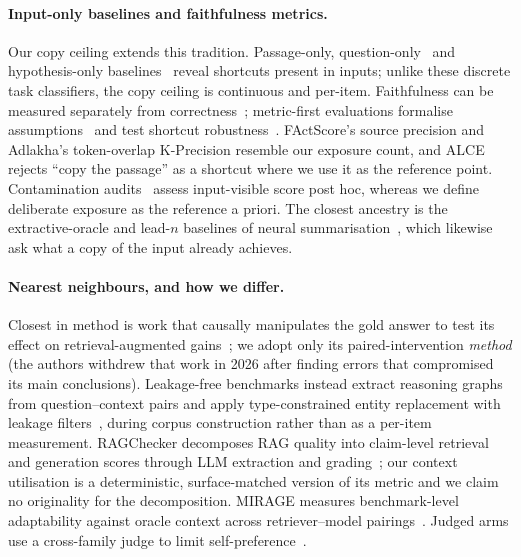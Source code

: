 \documentclass[10pt,twocolumn]{article}
\begin{document}
\paragraph{Input-only baselines and faithfulness metrics.}
Our copy ceiling extends this tradition. Passage-only, question-only~\cite{kaushik2018reading} and hypothesis-only baselines~\cite{gururangan2018artifacts,poliak2018hypothesis} reveal shortcuts present in inputs; unlike these discrete task classifiers, the copy ceiling is continuous and per-item. Faithfulness can be measured separately from correctness~\cite{es2023ragas,adlakha2024evaluating,zhou2023contextfaithful}; metric-first evaluations formalise assumptions~\cite{min2023factscore} and test shortcut robustness~\cite{gao2023alce}. FActScore's source precision and Adlakha's token-overlap K-Precision resemble our exposure count, and ALCE rejects ``copy the passage'' as a shortcut where we use it as the reference point. Contamination audits~\cite{sainz2023contamination,golchin2024timetravel} assess input-visible score post hoc, whereas we define deliberate exposure as the reference a priori. The closest ancestry is the extractive-oracle and lead-$n$ baselines of neural summarisation~\cite{see2017pointergenerator,narayan2018xsum}, which likewise ask what a copy of the input already achieves.

\paragraph{Nearest neighbours, and how we differ.}
Closest in method is work that causally manipulates the gold answer to test its effect on retrieval-augmented gains~\cite{answerpresence2026}; we adopt only its paired-intervention \emph{method} (the authors withdrew that work in 2026 after finding errors that compromised its main conclusions). Leakage-free benchmarks instead extract reasoning graphs from question--context pairs and apply type-constrained entity replacement with leakage filters~\cite{seedrg2026}, during corpus construction rather than as a per-item measurement. RAGChecker decomposes RAG quality into claim-level retrieval and generation scores through LLM extraction and grading~\cite{ragchecker2024}; our context utilisation is a deterministic, surface-matched version of its metric and we claim no originality for the decomposition. MIRAGE measures benchmark-level adaptability against oracle context across retriever--model pairings~\cite{mirage2025}. Judged arms use a cross-family judge to limit self-preference~\cite{zheng2023judging,panickssery2024selfpreference}.
\end{document}
